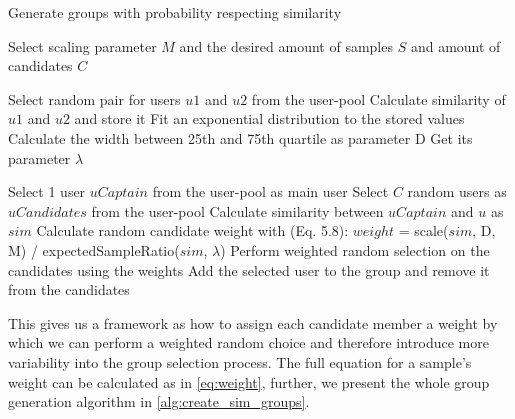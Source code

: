 \begin{algorithm}
	\caption{Generate groups with probability respecting similarity}
	\begin{algorithmic}[1]
	    \State Select scaling parameter $M$ and the desired amount of samples $S$ and amount of candidates $C$
	
	    \vspace{3mm}
	
    	    \State Select random pair for users $u1$ and $u2$ from the user-pool
    	    \State Calculate similarity of $u1$ and $u2$ and store it
	    \EndFor
	    \State Fit an exponential distribution to the stored values
	    \State Calculate the width between 25th and 75th quartile as parameter D
	    \State Get its parameter $\lambda$
	    
	    \vspace{3mm}
	    
    	    \State Select 1 user $uCaptain$ from the user-pool as main user
    	    \State Select $C$ random users as $uCandidates$ from the user-pool
    	        \State Calculate similarity between $uCaptain$ and $u$ as $sim$
    	        \State Calculate random candidate weight with (Eq. 5.8):
    	        \State $weight$ = scale($sim$, D, M) / expectedSampleRatio($sim$, $\lambda$)
    	    \EndFor
    	    \State Perform weighted random selection on the candidates using the weights
    	    \State Add the selected user to the group and remove it from the candidates
    	    \EndFor
        \EndFor
	\end{algorithmic}
	\label{alg:create_sim_groups}
\end{algorithm} 



This gives us a framework as how to assign each candidate member a weight by which we can perform a weighted random choice and therefore introduce more variability into the group selection process. The full equation for a sample's weight can be calculated as in \ref{eq:weight}, further, we present the whole group generation algorithm in \ref{alg:create_sim_groups}.











